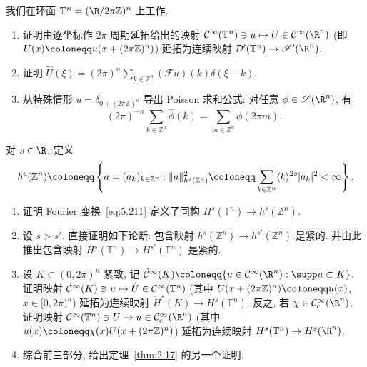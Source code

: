 \begin{exer}\label{ex:5.12}
我们在环面 $\mathbb{T}^n = (\R / 2\pi\mathbb{Z})^n$ 上工作.
\begin{enumerate}
    \item 证明由逐坐标作 $2\pi$-周期延拓给出的映射 $\Smooth(\mathbb{T}^n) \ni u \mapsto U \in \Smooth(\R^n)$ (即 $U(x) \defeq u(x + (2\pi\mathbb{Z})^n)$) 延拓为连续映射 $\mathcal{D}'(\mathbb{T}^n) \to \mathscr{S}'(\R^n)$.
    \item 证明 $\hat{U}(\xi) = (2\pi)^n \sum_{k \in \mathbb{Z}^n} (\mathcal{F} u)(k) \delta(\xi - k)$.
    \item 从特殊情形 $u = \delta_{0 + (2\pi\mathbb{Z})^n}$ 导出 Poisson 求和公式: 对任意 $\phi \in \mathscr{S}(\R^n)$, 有
    \begin{equation}\label{eq:5.216}
        (2\pi)^{-n} \sum_{k \in \mathbb{Z}^n} \hat{\phi}(k) = \sum_{m \in \mathbb{Z}^n} \phi(2\pi m).
    \end{equation}
\end{enumerate}
\end{exer}

\begin{exer}\label{ex:5.13}
对 $s \in \R$, 定义
\begin{equation}\label{eq:5.217}
    h^s(\mathbb{Z}^n) \defeq \left\{ a = (a_k)_{k \in \mathbb{Z}^n} : \|a\|_{h^s(\mathbb{Z}^n)}^2 \defeq \sum_{k \in \mathbb{Z}^n} \langle k \rangle^{2s} |a_k|^2 < \infty \right\}.
\end{equation}
\begin{enumerate}
    \item 证明 Fourier 变换~\eqref{eq:5.211} 定义了同构 $H^s(\mathbb{T}^n) \to h^s(\mathbb{Z}^n)$.
    \item 设 $s > s'$. 直接证明如下论断: 包含映射 $h^s(\mathbb{Z}^n) \to h^{s'}(\mathbb{Z}^n)$ 是紧的. 并由此推出包含映射 $H^s(\mathbb{T}^n) \to H^{s'}(\mathbb{T}^n)$ 是紧的.
    \item 设 $K \subset (0, 2\pi)^n$ 紧致, 记 $\dot{\mathcal{C}}^\infty(K) \defeq \{ u \in \Smooth(\R^n) : \supp u \subset K \}$. 证明映射 $\dot{\mathcal{C}}^\infty(K) \ni u \mapsto \dot{U} \in \mathcal{C}^\infty(\mathbb{T}^n)$ (其中 $U(x + (2\pi\mathbb{Z})^n) \defeq u(x)$, $x \in [0, 2\pi)^n$) 延拓为连续映射 $\dot{H}^s(K) \to H^s(\mathbb{T}^n)$. 反之, 若 $\chi \in \SmoothComp(\R^n)$, 证明映射 $\Smooth(\mathbb{T}^n) \ni U \mapsto u \in \SmoothComp(\R^n)$ (其中 $u(x) \defeq \chi(x) U(x + (2\pi\mathbb{Z})^n)$) 延拓为连续映射 $H^s(\mathbb{T}^n) \to H^s(\R^n)$.
    \item 综合前三部分, 给出定理~\ref{thm:2.17} 的另一个证明.
\end{enumerate}
\end{exer}

